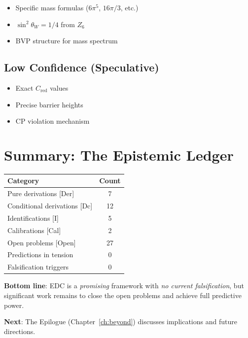 \begin{itemize}[nosep]
\item Specific mass formulas ($6\pi^5$, $16\pi/3$, etc.)
\item $\sin^2\theta_W = 1/4$ from $Z_6$
\item BVP structure for mass spectrum
\end{itemize}

\subsection{Low Confidence (Speculative)}

\begin{itemize}[nosep]
\item Exact $C_{\text{red}}$ values
\item Precise barrier heights
\item CP violation mechanism
\end{itemize}

\section{Summary: The Epistemic Ledger}
\label{sec:ledger}

\begin{center}
\begin{tabular}{lc}
\toprule
\textbf{Category} & \textbf{Count} \\
\midrule
Pure derivations [Der] & 7 \\
Conditional derivations [Dc] & 12 \\
Identifications [I] & 5 \\
Calibrations [Cal] & 2 \\
Open problems [Open] & 27 \\
Predictions in tension & 0 \\
Falsification triggers & 0 \\
\bottomrule
\end{tabular}
\end{center}

\textbf{Bottom line}: EDC is a \textit{promising} framework with
\textit{no current falsification}, but significant work remains to
close the open problems and achieve full predictive power.

\bigskip

\noindent\textbf{Next}: The Epilogue (Chapter~\ref{ch:beyond}) discusses
implications and future directions.
